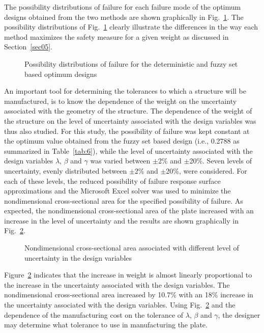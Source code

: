 \documentclass[stropt]{svjour}
\begin{document}
The possibility distributions of failure for each failure mode of the optimum
designs obtained from the two methods are shown graphically in
Fig.~\ref{fig:6}.
The possibility distributions of Fig.~\ref{fig:6} clearly illustrate the
differences in the way each method maximizes the safety measure for a given
weight as discussed in Section~\ref{sec05}.

\begin{figure}
\vspace{5cm}
\caption{Possibility distributions of failure for the deterministic and fuzzy
set based optimum designs}
\label{fig:6}
\end{figure}

An important tool for determining the tolerances to which a structure will be
manufactured, is to know the dependence of the weight on the uncertainty
associated with the geometry of the structure.
The dependence of the weight of the structure on the level of uncertainty
associated with the design variables was thus also studied.
For this study, the possibility of failure was kept constant at the optimum
value obtained from the fuzzy set based design (i.e., 0.2788 as summarized in
Table~\ref{tab:6}), while the level of uncertainty associated with the design
variables $\lambda$, $\beta$ and $\gamma$ was varied between $\pm$2\% and
$\pm$20\%.
Seven levels of uncertainty, evenly distributed between $\pm$2\% and
$\pm$20\%, were considered.
For each of these levels, the reduced possibility of failure response surface
approximations and the Microsoft Excel solver was used to minimize the
nondimensional cross-sectional area for the specified possibility of failure.
As expected, the nondimensional cross-sectional area of the plate increased
with an increase in the level of uncertainty and the results are shown
graphically in Fig.~\ref{fig:7}.

\begin{figure}
\vspace{5cm}
\caption{Nondimensional cross-sectional area associated with different level
of uncertainty in the design variables}
\label{fig:7}
\end{figure}

Figure~\ref{fig:7} indicates that the increase in weight is almost linearly
proportional to the increase in the uncertainty associated with the design
variables.
The nondimensional cross-sectional area increased by 10.7\% with an 18\%
increase in the uncertainty associated with the design variables.
Using Fig.~\ref{fig:7} and the dependence of the manufacturing cost on the
tolerance of $\lambda$, $\beta$ and $\gamma$, the designer may determine what
tolerance to use in manufacturing the plate.
\end{document}
